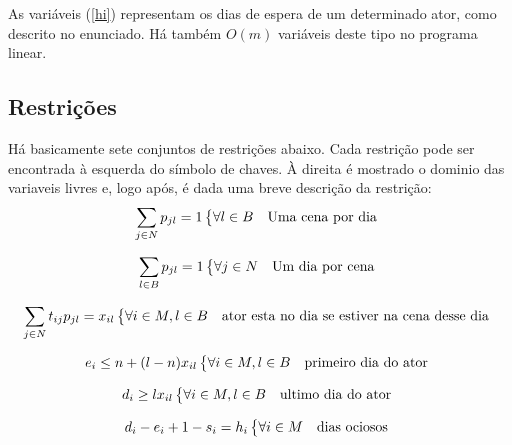 \documentclass[a4paper,11pt,twoside]{article}
\begin{document}
As variáveis (\ref{hi}) representam os dias de espera de um determinado ator, como
descrito no enunciado. Há também $O(m)$ variáveis deste tipo no programa linear.
\subsection{Restrições}
Há basicamente sete conjuntos de restrições abaixo. Cada restrição pode ser encontrada
à esquerda do símbolo de chaves. À direita é mostrado o dominio das variaveis livres
e, logo após, é dada uma breve descrição da restrição:
\begin{equation}
  \sum_{j \in N} p_{jl} = 1 \begin{dcases*} \forall l \in B & Uma cena por dia \end{dcases*}
  \label{cena_dia}
\end{equation}

\begin{equation}
  \sum_{l \in B} p_{jl} = 1 \begin{dcases*} \forall j \in N & Um dia por cena \end{dcases*}
  \label{dia_cena}
\end{equation}

\begin{equation}
  \sum_{j \in N} t_{ij} p_{jl} = x_{il} \begin{dcases*} \forall i \in M, l \in B & ator esta no dia se estiver na cena desse dia \end{dcases*}
  \label{actor_cene_day}
\end{equation}

\begin{equation}
  e_{i} \leq n + (l-n)x_{il} \begin{dcases*} \forall i \in M, l \in B & primeiro dia do ator \end{dcases*}
  \label{first_day}
\end{equation}

\begin{equation}
  d_{i} \geq lx_{il} \begin{dcases*} \forall i \in M, l \in B & ultimo dia do ator \end{dcases*}
  \label{last_day}
\end{equation}

\begin{equation}
  d_{i} - e_i + 1 - s_i = h_i \begin{dcases*} \forall i \in M & dias ociosos \end{dcases*}
  \label{wait}
\end{equation}
\end{document}
